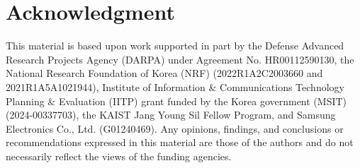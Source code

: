 \documentclass[10pt,conference]{IEEEtran}
\begin{document}









\section*{Acknowledgment}

This material is based upon work supported in part by
%
the Defense Advanced Research Projects Agency (DARPA) under Agreement No.
HR00112590130,
%
the National Research Foundation of Korea (NRF) (2022R1A2C2003660 and
2021R1A5A1021944),
%
Institute of Information \& Communications Technology Planning \& Evaluation
(IITP) grant funded by the Korea government (MSIT) (2024-00337703),
%
the KAIST Jang Young Sil Fellow Program,
%
and Samsung Electronics Co., Ltd. (G01240469).
%
Any opinions, findings, and conclusions or recommendations expressed in this
material are those of the authors and do not necessarily reflect the views of
the funding agencies.



\end{document}
